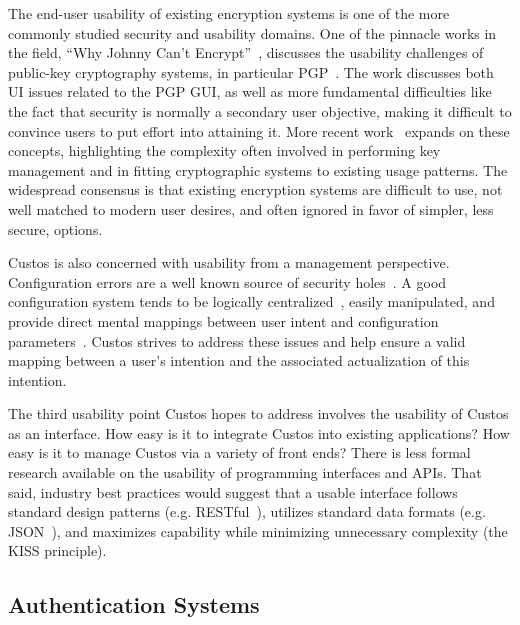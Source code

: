 The end-user usability of existing encryption systems is one of the
more commonly studied security and usability domains. One of the
pinnacle works in the field, ``Why Johnny Can't
Encrypt''~\cite{Whitten1998, Whitten1998}, discusses the usability
challenges of public-key cryptography systems, in particular
PGP~\cite{openpgp}. The work discusses both UI issues related to the
PGP GUI, as well as more fundamental difficulties like the fact that
security is normally a secondary user objective, making it difficult
to convince users to put effort into attaining it. More recent
work~\cite{Furnell2006, Furnell2006a, Furnell2010, Ibrahim2010,
  Sweikata2009} expands on these concepts, highlighting the complexity
often involved in performing key management and in fitting
cryptographic systems to existing usage patterns. The widespread
consensus is that existing encryption systems are difficult to use,
not well matched to modern user desires, and often ignored in favor of
simpler, less secure, options.

Custos is also concerned with usability from a management
perspective. Configuration errors are a well known source of security
holes~\cite{Bishop1996, kerravala2002configuration}. A good
configuration system tends to be logically
centralized~\cite{Casado2007}, easily manipulated, and provide direct
mental mappings between user intent and configuration
parameters~\cite{norman2002design}. Custos strives to address these
issues and help ensure a valid mapping between a user's intention and
the associated actualization of this intention.

The third usability point Custos hopes to address involves the
usability of Custos as an interface. How easy is it to integrate
Custos into existing applications? How easy is it to manage Custos via
a variety of front ends? There is less formal research available on
the usability of programming interfaces and APIs. That said, industry
best practices would suggest that a usable interface follows standard
design patterns (e.g. RESTful~\cite{ibm-restful}), utilizes standard
data formats (e.g. JSON~\cite{json}), and maximizes capability while
minimizing unnecessary complexity (the KISS principle).

\subsection{Authentication Systems}

